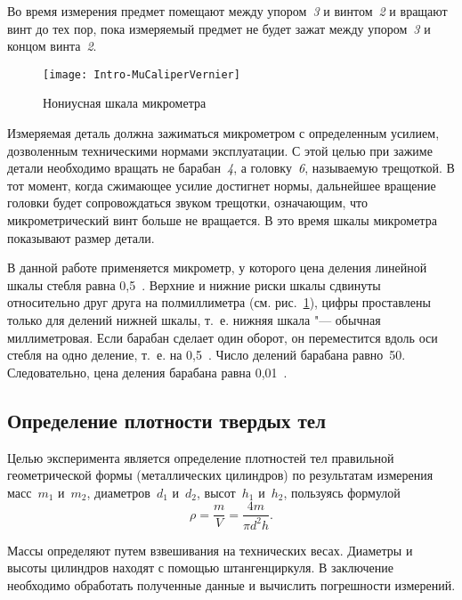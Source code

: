 \documentclass[a4paper, 12pt]{extarticle}
\begin{document}
Во время измерения предмет помещают между упором~\emph{3} и винтом~\emph{2} и вращают винт до тех пор, пока измеряемый предмет не будет зажат между упором~\emph{3} и концом винта~\emph{2}.

\begin{figure}[h!]
 \begin{center}
  \texttt{[image: Intro-MuCaliperVernier]}
  \caption{Нониусная шкала микрометра\label{fig:mzero-mu-caliper-vernier}}
 \end{center}
\end{figure}


Измеряемая деталь должна зажиматься микрометром с определенным усилием, дозволенным техническими нормами эксплуатации. С этой целью при зажиме детали необходимо вращать не барабан~\emph{4}, а головку~\emph{6}, называемую трещоткой. В тот момент, когда сжимающее усилие достигнет  нормы, дальнейшее вращение головки будет сопровождаться звуком трещотки,  означающим, что микрометрический винт больше не вращается. В это время шкалы микрометра показывают размер детали.



В данной работе применяется микрометр, у которого цена деления линейной шкалы стебля равна 0,5~. Верхние и нижние риски шкалы сдвинуты относительно друг друга на полмиллиметра (см. рис.~\ref{fig:mzero-mu-caliper-vernier}), цифры проставлены только для делений нижней шкалы, т.~е. нижняя шкала "--- обычная миллиметровая. Если барабан сделает один оборот, он переместится вдоль оси стебля на одно деление, т.~е. на 0,5~. Число делений барабана равно~50. Следовательно, цена деления барабана равна 0,01~.




\subsection{Определение плотности твердых тел}

Целью эксперимента является определение плотностей тел правильной геометрической формы (металлических цилиндров) по результатам измерения масс~$m_1$ и~$m_2$, диаметров~$d_1$ и~$d_2$, высот~$h_1$ и~$h_2$, пользуясь формулой
\begin{equation}
\label{fig:mzero-density}
\rho = \frac{m}{V} = \frac{4m}{\pi d^2 h}.
\end{equation}

Массы определяют путем взвешивания на технических весах. Диаметры и высоты цилиндров находят с помощью штангенциркуля. В заключение необходимо обработать полученные данные и вычислить погрешности измерений.
\end{document}
